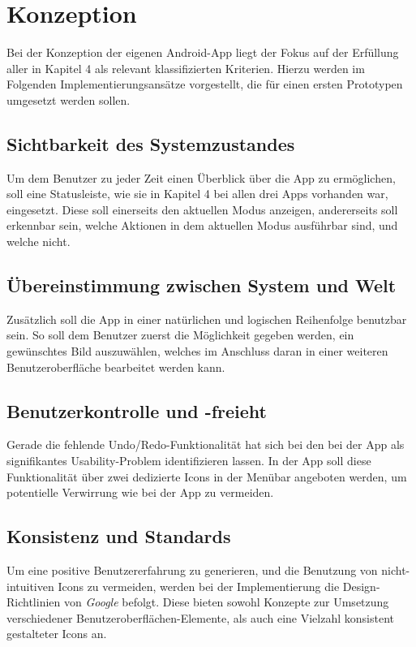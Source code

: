 \chapter{Konzeption}

Bei der Konzeption der eigenen Android-App liegt der Fokus auf der Erfüllung aller in Kapitel 4 als relevant klassifizierten Kriterien.
Hierzu werden im Folgenden Implementierungsansätze vorgestellt, die für einen ersten Prototypen umgesetzt werden sollen.

\section{Sichtbarkeit des Systemzustandes}
Um dem Benutzer zu jeder Zeit einen Überblick über die App zu ermöglichen, soll eine Statusleiste, wie sie in Kapitel 4 bei allen drei Apps vorhanden war, eingesetzt.
Diese soll einerseits den aktuellen Modus anzeigen, andererseits soll erkennbar sein, welche Aktionen in dem aktuellen Modus ausführbar sind, und welche nicht.

\section{Übereinstimmung zwischen System und Welt}
Zusätzlich soll die App in einer natürlichen und logischen Reihenfolge benutzbar sein.
So soll dem Benutzer zuerst die Möglichkeit gegeben werden, ein gewünschtes Bild auszuwählen, welches im Anschluss daran in einer weiteren Benutzeroberfläche bearbeitet werden kann.

\section{Benutzerkontrolle und -freieht}
Gerade die fehlende Undo/Redo-Funktionalität hat sich bei den bei der App \pm{} als signifikantes Usability-Problem identifizieren lassen.
In der App soll diese Funktionalität über zwei dedizierte Icons in der Menübar angeboten werden, um potentielle Verwirrung wie bei der App \im{} zu vermeiden.

\section{Konsistenz und Standards}
Um eine positive Benutzererfahrung zu generieren, und die Benutzung von nicht-intuitiven Icons zu vermeiden, werden bei der Implementierung die Design-Richtlinien von \emph{Google} befolgt.
Diese bieten sowohl Konzepte zur Umsetzung verschiedener Benutzeroberflächen-Elemente, als auch eine Vielzahl konsistent gestalteter Icons an.  

